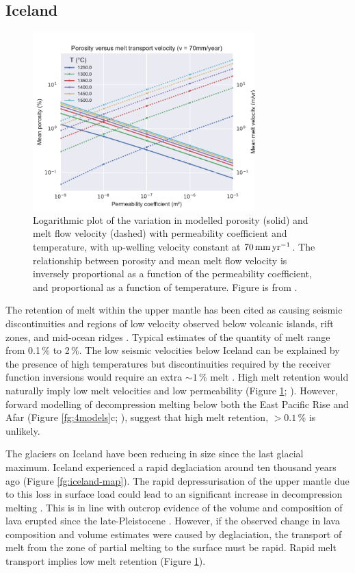 \subsection{Iceland}

\begin{figure}[htbp]
\includegraphics[width=8.6cm]{figures/ch2-phi-vm.pdf}
\caption{Logarithmic plot of the variation in modelled porosity (solid) and melt flow velocity (dashed) with permeability coefficient and temperature, with up-welling velocity constant at $70\rm\,mm\,yr^{-1}$. The relationship between porosity and mean melt flow velocity is inversely proportional as a function of the permeability coefficient, and proportional as a function of temperature. Figure is from \cite{franken-etal-2020}.}
\label{fg:phi-vm}
\end{figure}

The retention of melt within the upper mantle has been cited as causing seismic discontinuities and regions of low velocity observed below volcanic islands, rift zones, and mid-ocean ridges \citep[e.g.][]{forsyth-etal-1998,harmon-etal-2009,rychert-etal-2012,rychert-etal-2014}. Typical estimates of the quantity of melt range from 0.1\,\% to 2\,\%. The low seismic velocities below Iceland can be explained by the presence of high temperatures but discontinuities required by the receiver function inversions would require an extra $\sim 1$\,\% melt \citep{rychert-etal-2018}. High melt retention would naturally imply low melt velocities and low permeability (Figure \ref{fg:phi-vm}; \citealp{franken-etal-2020}). However, forward modelling of decompression melting below both the East Pacific Rise and Afar (Figure \ref{fg:4models}c; \citealp{goes-etal-2012,armitage-etal-2015}), suggest that high melt retention, $>0.1$\,\% is unlikely. 

The glaciers on Iceland have been reducing in size since the last glacial maximum. Iceland experienced a rapid deglaciation around ten thousand years ago (Figure \ref{fg:iceland-map}). The rapid depressurisation of the upper mantle due to this loss in surface load could lead to an significant increase in decompression melting \citep{jull-1996}. This is in line with outcrop evidence of the volume and composition of lava erupted since the late-Pleistocene \citep{maclennan-etal-2002,sinton-etal-2005,eksinchol-etal-2019}. However, if the observed change in lava composition and volume estimates were caused by deglaciation, the transport of melt from the zone of partial melting to the surface must be rapid. Rapid melt transport implies low melt retention (Figure \ref{fg:phi-vm}).

